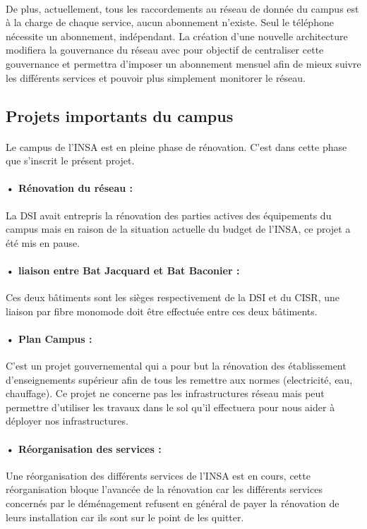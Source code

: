 \paragraph{} De plus, actuellement, tous les raccordements au réseau de donnée du campus est à la charge de chaque service, aucun abonnement n'existe. Seul le téléphone nécessite un abonnement, indépendant. La création d'une nouvelle architecture modifiera la gouvernance du réseau avec pour objectif de centraliser cette gouvernance et permettra d'imposer un abonnement mensuel afin de mieux suivre les différents services et pouvoir plus simplement monitorer le réseau.


\subsection{Projets importants du campus}

\paragraph{} Le campus de l'INSA est en pleine phase de rénovation. C'est dans cette phase que s'inscrit le présent projet.

\paragraph{• Rénovation du réseau :} La DSI avait entrepris la rénovation des parties actives des équipements du campus mais en raison de la situation actuelle du budget de l'INSA, ce projet a été mis en pause.

\paragraph{• liaison entre Bat Jacquard et Bat Baconier :} Ces deux bâtiments sont les sièges respectivement de la DSI et du CISR, une liaison par fibre monomode doit être effectuée entre ces deux bâtiments.

\paragraph{• Plan Campus :} C'est un projet gouvernemental qui a pour but la rénovation des établissement d'enseignements supérieur afin de tous les remettre aux normes (electricité, eau, chauffage). Ce projet ne concerne pas les infrastructures réseau mais peut permettre d'utiliser les travaux dans le sol qu'il effectuera pour nous aider à déployer nos infrastructures.

\paragraph{• Réorganisation des services :} Une réorganisation des différents services de l'INSA est en cours, cette réorganisation bloque l'avancée de la rénovation car les différents services concernés par le déménagement refusent en général de payer la rénovation de leurs installation car ils sont sur le point de les quitter.



